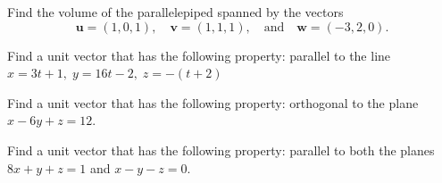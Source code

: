 \documentclass[openany]{book}
\begin{document}
\begin{prob}[36]
    Find the volume of the parallelepiped spanned by the vectors  
\[
\mathbf{u} = (1, 0, 1), \quad \mathbf{v} = (1, 1, 1), \quad \text{and} \quad \mathbf{w} = (-3, 2, 0).
\]
\end{prob}


\begin{prob}[52]
    Find a unit vector that has the following property:
    parallel to the line \( x = 3t + 1, \; y = 16t - 2, \; z = -(t + 2) \)
\end{prob}



\begin{prob}[53]
    Find a unit vector that has the following property: 
    orthogonal to the plane \( x - 6y + z = 12 \).
\end{prob}


\begin{prob}[54]
    Find a unit vector that has the following property:
    parallel to both the planes \( 8x + y + z = 1 \) and \( x - y - z = 0 \).
\end{prob}
\end{document}
